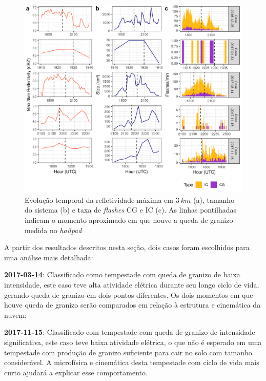 \begin{figure}[hp]
	\begin{center}
		\caption{Evolução temporal da refletividade máxima em $3\:km$ (a), tamanho do sistema (b) e taxa de \textit{flashes} CG e IC (c). As linhas pontilhadas indicam o momento aproximado em que houve a queda de granizo medida no \textit{hailpad}} 
		\label{painel_ciclo}
		\includegraphics[width=0.99\columnwidth]{../General_Processing/figures/cases_dbz_size_lightning.png}
	\end{center}
\end{figure}



A partir dos resultados descritos nesta seção, dois casos foram escolhidos para uma análise mais detalhada:

\begin{alineas}
	\item \textbf{2017-03-14}: Classificado como tempestade com queda de granizo de baixa intensidade, este caso teve alta atividade elétrica durante seu longo ciclo de vida, gerando queda de granizo em dois pontos diferentes. Os dois momentos em que houve queda de granizo serão comparados em relação à estrutura e cinemática da nuvem;
	\item \textbf{2017-11-15}: Classificado com tempestade com queda de granizo de intensidade significativa, este caso teve baixa atividade elétrica, o que não é esperado em uma tempestade com produção de granizo suficiente para cair no solo com tamanho considerável. A microfísica e cinemática desta tempestade com ciclo de vida mais curto ajudará a explicar esse comportamento.
\end{alineas}

